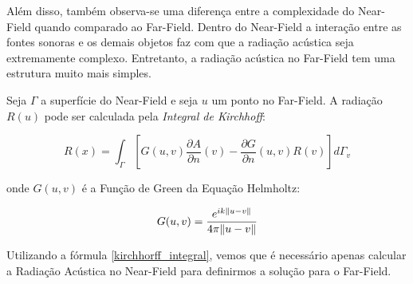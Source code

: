 Além disso, também observa-se uma diferença entre a complexidade do Near-Field quando comparado ao Far-Field. Dentro do Near-Field a interação entre as fontes sonoras e os demais objetos faz com que a radiação acústica seja extremamente complexo. Entretanto, a radiação acústica no Far-Field tem uma estrutura muito mais simples.

Seja $\Gamma$ a superfície do Near-Field e seja $u$ um ponto no Far-Field. A radiação $R(u)$ pode ser calculada pela \emph{Integral de Kirchhoff}:

\begin{equation}
	R(x) = \int_{\Gamma} \left[G(u, v)\frac{\partial A}{\partial n}(v) - \frac{\partial G}{\partial n}(u, v)R(v) \right] d\Gamma_v
	\label{kirchhorff_integral}
\end{equation}

onde $G(u, v)$ é a Função de Green da Equação Helmholtz:

\begin{equation}
	G(u, v) = \frac{e^{ik\lVert u-v\rVert}}{4\pi \lVert u-v\rVert}
\end{equation}

Utilizando a fórmula \eqref{kirchhorff_integral}, vemos que é necessário apenas calcular a Radiação Acústica no Near-Field para definirmos a solução para o Far-Field.